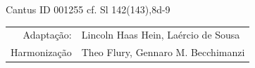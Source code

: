 \begin{flushright}
  Cantus ID 001255 cf. Sl 142(143),8d-9
  \hfill
  \begin{tabular}{rl}
    Adaptação: & Lincoln Haas Hein, Laércio de Sousa \\
    Harmonização & Theo Flury, Gennaro M. Becchimanzi
  \end{tabular}
\end{flushright}

